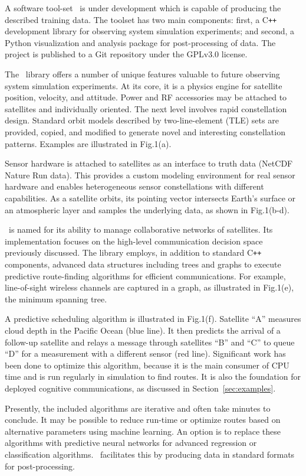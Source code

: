 \documentclass[conference]{IEEEtran}
\newcommand{\project}{{\sc{Collaborate}}~}
\newcommand{\cpp}{C\texttt{++}~}
\begin{document}
A software tool-set \project is under development which is capable of producing
the described training data.  The toolset has two main components: first, a \cpp
development library for observing system simulation experiments; and second, a
Python visualization and analysis package for post-processing of data.  The
project is published to a Git repository under the GPLv3.0 license.

The \project library offers a number of unique features valuable to future
observing system simulation experiments.  At its core, it is a physics engine
for satellite position, velocity, and attitude.  Power and RF accessories may be
attached to satellites and individually oriented.  The next level involves rapid
constellation design.  Standard orbit models described by two-line-element (TLE)
sets are provided, copied, and modified to generate novel and interesting
constellation patterns.  Examples are illustrated in Fig.1(a).

Sensor hardware is attached to satellites as an interface to truth data (NetCDF
Nature Run data).  This provides a custom modeling environment for real sensor
hardware and enables heterogeneous sensor constellations with different
capabilities.  As a satellite orbits, its pointing vector intersects Earth's
surface or an atmospheric layer and samples the underlying data, as shown in
Fig.1(b-d).

\project is named for its ability to manage collaborative networks of
satellites.  Its implementation focuses on the high-level communication decision
space previously discussed.  The library employs, in addition to standard \cpp
components, advanced data structures including trees and graphs to execute
predictive route-finding algorithms for efficient communications.  For example,
line-of-sight wireless channels are captured in a graph, as illustrated in
Fig.1(e), the minimum spanning tree.

A predictive scheduling algorithm is illustrated in Fig.1(f).  Satellite ``A''
measures cloud depth in the Pacific Ocean (blue line).  It then predicts the
arrival of a follow-up satellite and relays a message through satellites ``B''
and ``C'' to queue ``D'' for a measurement with a different sensor (red line).
Significant work has been done to optimize this algorithm, because it is the
main consumer of CPU time and is run regularly in simulation to find routes.  It
is also the foundation for deployed cognitive communications, as discussed in
Section~\ref{sec:examples}.

Presently, the included algorithms are iterative and often take minutes to
conclude.  It may be possible to reduce run-time or optimize routes based on
alternative parameters using machine learning.  An option is to replace these
algorithms with predictive neural networks for advanced regression or
classification algorithms.  \project facilitates this by producing data
in standard formats for post-processing.
\end{document}
